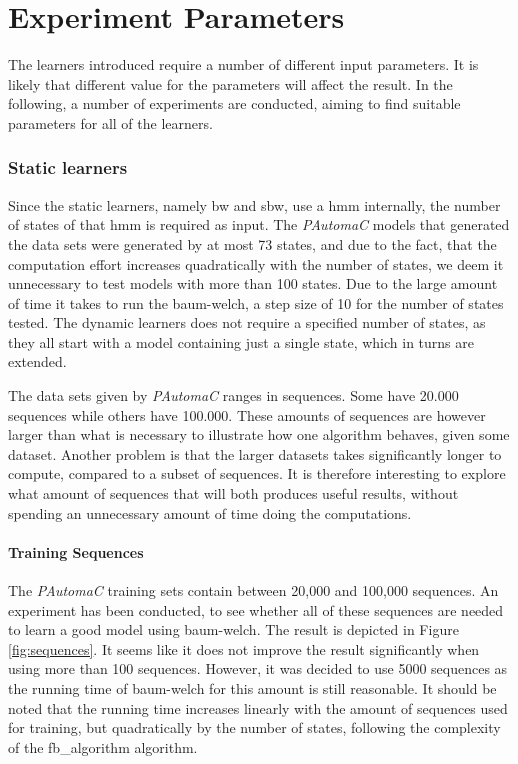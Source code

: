 \section{Experiment Parameters}\label{sec:parameters}
The learners introduced require a number of different input parameters. It is likely that different value for the parameters will affect the result. In the following, a number of experiments are conducted, aiming to find suitable parameters for all of the learners. 

\subsubsection{Static learners}
Since the static learners, namely \gls{bw} and \gls{sbw}, use a \gls{hmm} internally, the number of states of that \gls{hmm} is required as input.
The \emph{PAutomaC} models that generated the data sets were generated by at most 73 states, and due to the fact, that the computation effort increases quadratically with the number of states, we deem it unnecessary to test models with more than 100 states. Due to the large amount of time it takes to run the \gls{baum-welch}, a step size of 10 for the number of states tested.
The dynamic learners does not require a specified number of states, as they all start with a model containing just a single state, which in turns are extended.

The data sets given by \emph{PAutomaC} ranges in sequences. Some have 20.000 sequences while others have 100.000. These amounts of sequences are however larger than what is necessary to illustrate how one algorithm behaves, given some dataset. Another problem is that the larger datasets takes significantly longer to compute, compared to a subset of sequences. It is therefore interesting to explore what amount of sequences that will both produces useful results, without spending an unnecessary amount of time doing the computations.

\paragraph{Training Sequences}
The \emph{PAutomaC} training sets contain between 20,000 and 100,000 sequences.
An experiment has been conducted, to see whether all of these sequences are needed to learn a good model using \gls{baum-welch}.
The result is depicted in Figure \ref{fig:sequences}. It seems like it does not improve the result significantly when using more than 100 sequences.
However, it was decided to use 5000 sequences as the running time of \gls{baum-welch} for this amount is still reasonable. It should be noted that the running time increases linearly with the amount of sequences used for training, but quadratically by the number of states, following the complexity of the \gls{fb_algorithm} algorithm.

